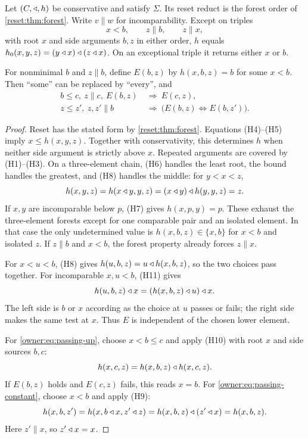 \begin{lemma}\label{owner:lem:passing}
Let $(C,\mathbin{\triangleleft},h)$ be conservative and satisfy $\Sigma$. Its reset
reduct is the forest order of \cref{reset:thm:forest}. Write
$v\parallel w$ for incomparability. Except on triples
\[
 x<b,\qquad z\parallel b,\qquad z\parallel x,
\]
with root $x$ and side arguments $b,z$ in either order, $h$ equals
$h_0(x,y,z)=(y\mathbin{\triangleleft} x)\mathbin{\triangleleft}(z\mathbin{\triangleleft} x)$.
On an exceptional triple it returns either $x$ or $b$.

For nonminimal $b$ and $z\parallel b$, define $E(b,z)$ by
$h(x,b,z)=b$ for some $x<b$. Then ``some'' can be replaced by
``every'', and
\begin{align}
 b\leq c,\ z\parallel c,\ E(b,z)&\ \Longrightarrow\ E(c,z),
       \label{owner:eq:passing-up}\\
 z\leq z',\ z,z'\parallel b&\ \Longrightarrow\
       \bigl(E(b,z)\Longleftrightarrow E(b,z')\bigr).
       \label{owner:eq:passing-constant}
\end{align}
\end{lemma}
\begin{proof}
Reset has the stated form by \cref{reset:thm:forest}. Equations
(H4)--(H5) imply $x\leq h(x,y,z)$. Together with conservativity,
this determines $h$ when neither side argument is strictly above $x$.
Repeated arguments are covered by (H1)--(H3). On a three-element
chain, (H6) handles the least root, the bound handles the greatest,
and (H8) handles the middle: for $y<x<z$,
\[
 h(x,y,z)=h(x\mathbin{\triangleleft} y,y,z)
          =(x\mathbin{\triangleleft} y)\mathbin{\triangleleft} h(y,y,z)=z.
\]
If $x,y$ are incomparable below $p$, (H7) gives $h(x,p,y)=p$.
These exhaust the three-element forests except for one comparable
pair and an isolated element. In that case the only undetermined
value is $h(x,b,z)\in\{x,b\}$ for $x<b$ and isolated $z$.
If $z\parallel b$ and $x<b$, the forest property already forces
$z\parallel x$.

For $x<u<b$, (H8) gives
$h(u,b,z)=u\mathbin{\triangleleft} h(x,b,z)$, so the two choices pass together.
For incomparable $x,u<b$, (H11) gives
\[
 h(u,b,z)\mathbin{\triangleleft} x=(h(x,b,z)\mathbin{\triangleleft} u)\mathbin{\triangleleft} x.
\]
The left side is $b$ or $x$ according as the choice at $u$ passes
or fails; the right side makes the same test at $x$. Thus $E$ is
independent of the chosen lower element.

For \eqref{owner:eq:passing-up}, choose $x<b\leq c$ and apply
(H10) with root $x$ and side sources $b,c$:
\[
 h(x,c,z)=h(x,b,z)\mathbin{\triangleleft} h(x,c,z).
\]
If $E(b,z)$ holds and $E(c,z)$ fails, this reads $x=b$.
For \eqref{owner:eq:passing-constant}, choose $x<b$ and apply (H9):
\[
 h(x,b,z')=h(x,b\mathbin{\triangleleft} x,z'\mathbin{\triangleleft} z)
          =h(x,b,z)\mathbin{\triangleleft}(z'\mathbin{\triangleleft} x)=h(x,b,z).
\]
Here $z'\parallel x$, so $z'\mathbin{\triangleleft} x=x$.
\end{proof}

